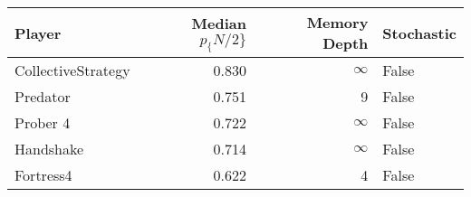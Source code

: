 \begin{tabular}{lrrl}
\toprule
             Player &  Median $p_\{N/2\}$ &  Memory Depth & Stochastic \\
\midrule
 CollectiveStrategy &             0.830 &            \(\infty\) &      False \\
           Predator &             0.751 &             9 &      False \\
           Prober 4 &             0.722 &            \(\infty\) &      False \\
          Handshake &             0.714 &            \(\infty\) &      False \\
          Fortress4 &             0.622 &             4 &      False \\
\bottomrule
\end{tabular}
